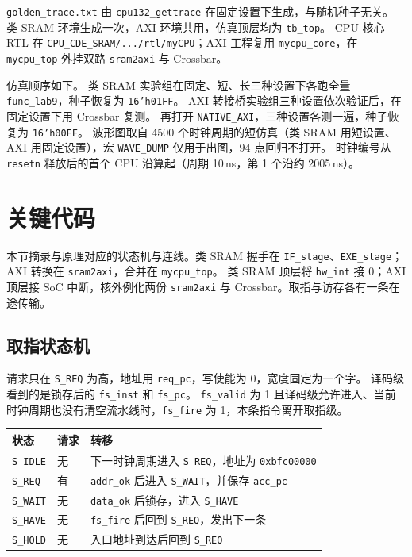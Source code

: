 \documentclass{article}
\begin{document}
\texttt{golden\_trace.txt} 由 \texttt{cpu132\_gettrace} 在固定设置下生成，与随机种子无关。
类 SRAM 环境生成一次，AXI 环境共用，仿真顶层均为 \texttt{tb\_top}。
CPU 核心 RTL 在 \texttt{CPU\_CDE\_SRAM/.../rtl/myCPU}；AXI 工程复用 \texttt{mycpu\_core}，在 \texttt{mycpu\_top} 外挂双路 \texttt{sram2axi} 与 Crossbar。

仿真顺序如下。
类 SRAM 实验组在固定、短、长三种设置下各跑全量 \texttt{func\_lab9}，种子恢复为 \texttt{16'h01FF}。
AXI 转接桥实验组三种设置依次验证后，在固定设置下用 Crossbar 复测。
再打开 \texttt{NATIVE\_AXI}，三种设置各测一遍，种子恢复为 \texttt{16'h00FF}。
波形图取自 4500 个时钟周期的短仿真（类 SRAM 用短设置、AXI 用固定设置），宏 \texttt{WAVE\_DUMP} 仅用于出图，94 点回归不打开。
时钟编号从 \texttt{resetn} 释放后的首个 CPU 沿算起（周期 10\,ns，第 1 个沿约 2005\,ns）。

\section{关键代码}
本节摘录与原理对应的状态机与连线。类 SRAM 握手在 \texttt{IF\_stage}、\texttt{EXE\_stage}；AXI 转换在 \texttt{sram2axi}，合并在 \texttt{mycpu\_top}。
类 SRAM 顶层将 \texttt{hw\_int} 接 0；AXI 顶层接 SoC 中断，核外例化两份 \texttt{sram2axi} 与 Crossbar。取指与访存各有一条在途传输。

\subsection{取指状态机}
请求只在 \texttt{S\_REQ} 为高，地址用 \texttt{req\_pc}，写使能为 0，宽度固定为一个字。
译码级看到的是锁存后的 \texttt{fs\_inst} 和 \texttt{fs\_pc}。
\texttt{fs\_valid} 为 1 且译码级允许进入、当前时钟周期也没有清空流水线时，\texttt{fs\_fire} 为 1，本条指令离开取指级。

\begin{center}
\small
\begin{tabular}{@{}llp{}@{}}
\toprule
状态 & 请求 & 转移 \\
\midrule
\texttt{S\_IDLE} & 无 & 下一时钟周期进入 \texttt{S\_REQ}，地址为 \texttt{0xbfc00000} \\
\texttt{S\_REQ} & 有 & \texttt{addr\_ok} 后进入 \texttt{S\_WAIT}，并保存 \texttt{acc\_pc} \\
\texttt{S\_WAIT} & 无 & \texttt{data\_ok} 后锁存，进入 \texttt{S\_HAVE} \\
\texttt{S\_HAVE} & 无 & \texttt{fs\_fire} 后回到 \texttt{S\_REQ}，发出下一条 \\
\texttt{S\_HOLD} & 无 & 入口地址到达后回到 \texttt{S\_REQ} \\
\bottomrule
\end{tabular}
\end{center}
\end{document}
